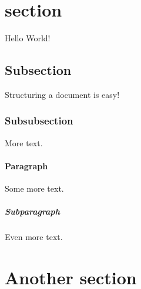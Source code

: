 \documentclass{article}
\begin{document}
	\section{section}
	Hello World!
	\subsection{Subsection}
	Structuring a document is easy!
	\subsubsection{Subsubsection}
	More text.
	\paragraph{Paragraph}
	Some more text.
	\subparagraph{Subparagraph}
	Even more text.
	\section{Another section}
\end{document}
